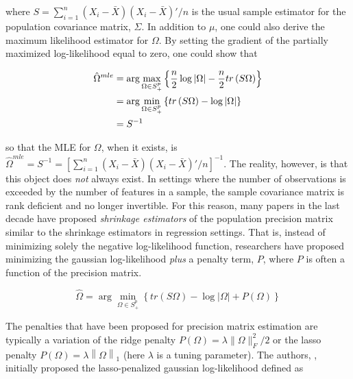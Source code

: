 \documentclass[11pt,]{report}
\theoremstyle{definition}
\theoremstyle{definition}
\theoremstyle{definition}
\theoremstyle{remark}
\begin{document}
where \(S = \sum_{i = 1}^{n}\left(X_{i} - \bar{X}\right)\left(X_{i} - \bar{X}\right)'/n\) is the usual sample estimator for the population covariance matrix, \(\Sigma\). In addition to \(\mu\), one could also derive the maximum likelihood estimator for \(\Omega\). By setting the gradient of the partially maximized log-likelihood equal to zero, one could show that

\begin{equation}
\begin{split}
\hat{\Omega}^{mle} &= \arg\max_{\Omega \in S_{+}^{p}}\left\{ \frac{n}{2}\log\left| \Omega \right| - \frac{n}{2}tr\left(S\Omega \right) \right\} \\
  &= \arg\min_{\Omega \in S_{+}^{p}}\left\{ tr\left(S\Omega\right) - \log\left|\Omega\right| \right\} \\
  &= S^{-1}
\end{split}
\label{eq:omegamle}\notag
\end{equation}

so that the MLE for \(\Omega\), when it exists, is \(\hat{\Omega}^{mle} = S^{-1} = \left[\sum_{i = 1}^{n}\left(X_{i} - \bar{X}\right)\left(X_{i} - \bar{X}\right)'/n \right]^{-1}\). The reality, however, is that this object does \emph{not} always exist. In settings where the number of observations is exceeded by the number of features in a sample, the sample covariance matrix is rank deficient and no longer invertible. For this reason, many papers in the last decade have proposed \emph{shrinkage estimators} of the population precision matrix similar to the shrinkage estimators in regression settings. That is, instead of minimizing solely the negative log-likelihood function, researchers have proposed minimizing the gaussian log-likelihood \emph{plus} a penalty term, \(P\), where \(P\) is often a function of the precision matrix.

\begin{equation}
\hat{\Omega} = \arg\min_{\Omega \in S_{+}^{p}}\left\{ tr\left(S\Omega\right) - \log\left|\Omega \right| + P\left( \Omega \right) \right\}
\label{eq:omegapen}
\end{equation}

The penalties that have been proposed for precision matrix estimation are typically a variation of the ridge penalty \(P\left(\Omega \right) = \lambda\|\Omega \|_{F}^{2}/2\) or the lasso penalty \(P\left(\Omega \right) = \lambda\left\|\Omega\right\|_{1}\) (here \(\lambda\) is a tuning parameter). The authors, \citet{yuan2007model}, initially proposed the lasso-penalized gaussian log-likelihood defined as
\end{document}
